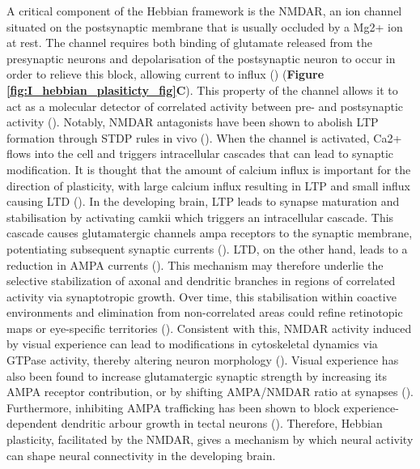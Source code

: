 A critical component of the Hebbian framework is the NMDAR, an ion channel situated on the postsynaptic membrane that is usually occluded by a Mg2+ ion at rest. The channel requires both binding of glutamate released from the presynaptic neurons and depolarisation of the postsynaptic neuron to occur in order to relieve this block, allowing current to influx (\cite{Nowak1984MagnesiumNeurones}) (\textbf{Figure \ref{fig:I_hebbian_plasiticty_fig}C}). This property of the channel allows it to act as a molecular detector of correlated activity between pre- and postsynaptic activity (\cite{Yashiro2008RegulationMetaplasticity}). Notably, NMDAR antagonists have been shown to abolish LTP formation through STDP rules in vivo (\cite{Zhang1998ASynapses}). When the channel is activated, Ca2+ flows into the cell and triggers intracellular cascades that can lead to synaptic modification. It is thought that the amount of calcium influx is important for the direction of plasticity, with large calcium influx resulting in LTP and small influx causing LTD (\cite{Yashiro2008RegulationMetaplasticity}). In the developing brain, LTP leads to synapse maturation and stabilisation by activating \gls{camkii} which triggers an intracellular cascade.  This cascade causes glutamatergic channels \gls{ampa} receptors to the synaptic membrane,  potentiating subsequent synaptic currents (\cite{Wu1996MaturationSynapse,Wu1998StabilizationCaMKII,Rajan1998GlutamateVivo}). LTD, on the other hand, leads to a reduction in AMPA currents (\cite{Munz2014RapidStimulation}). This mechanism may therefore underlie the selective stabilization of axonal and dendritic branches in regions of correlated activity via synaptotropic growth. Over time, this stabilisation within coactive environments and elimination from non-correlated areas could refine retinotopic maps or eye-specific territories (\cite{Ruthazer2003ControlVivo, Munz2014RapidStimulation}). Consistent with this, NMDAR activity induced by visual experience can lead to modifications in cytoskeletal dynamics via GTPase activity, thereby altering neuron morphology (\cite{Sin2002DendriteGTPases}). Visual experience has also been found to increase glutamatergic synaptic strength by increasing its AMPA receptor contribution, or by shifting AMPA/NMDAR ratio at synapses (\cite{Engert2002MovingNeurons}). Furthermore, inhibiting AMPA trafficking has been shown to block experience-dependent dendritic arbour growth in tectal neurons (\cite{Haas2006AMPAVivo}). Therefore, Hebbian plasticity, facilitated by the NMDAR, gives a mechanism by which neural activity can shape neural connectivity in the developing brain.

